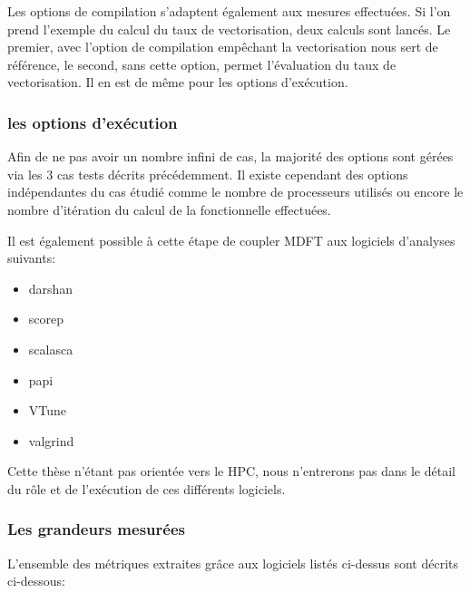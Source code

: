 Les options de compilation s'adaptent également aux mesures effectuées. Si l'on prend l'exemple du calcul du taux de vectorisation, deux calculs sont lancés. Le premier, avec l'option de compilation empêchant la vectorisation nous sert de référence, le second, sans cette option, permet l'évaluation du taux de vectorisation. Il en est de même pour les options d'exécution.


\subsubsection{ les options d'exécution }
Afin de ne pas avoir un nombre infini de cas, la majorité des options sont gérées via les 3 cas tests décrits précédemment. Il existe cependant des options indépendantes du cas étudié comme le nombre de processeurs utilisés ou encore le nombre d’itération du calcul de la fonctionnelle effectuées.

Il est également possible à cette étape de coupler MDFT aux logiciels d'analyses suivants:
\begin{itemize}
\item darshan
\item scorep
\item scalasca
\item papi
\item VTune
\item valgrind
\end{itemize}
Cette thèse n'étant pas orientée vers le HPC, nous n'entrerons pas dans le détail du rôle et de l’exécution de ces différents logiciels.


\subsubsection{ Les grandeurs mesurées }
L'ensemble des métriques extraites grâce aux logiciels listés ci-dessus sont décrits ci-dessous:

